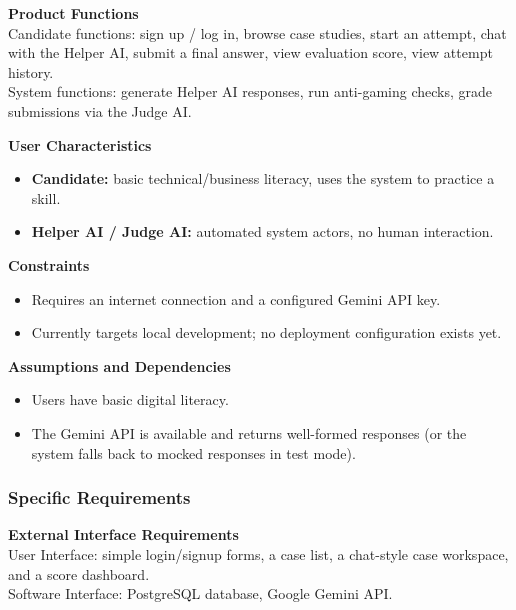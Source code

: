 \documentclass[11pt]{article}
\begin{document}
\textbf{Product Functions}\\
Candidate functions: sign up / log in, browse case studies, start an attempt, chat with the
Helper AI, submit a final answer, view evaluation score, view attempt history.\\
System functions: generate Helper AI responses, run anti-gaming checks, grade submissions
via the Judge AI.

\textbf{User Characteristics}
\begin{itemize}[nosep]
  \item \textbf{Candidate:} basic technical/business literacy, uses the system to practice a skill.
  \item \textbf{Helper AI / Judge AI:} automated system actors, no human interaction.
\end{itemize}

\textbf{Constraints}
\begin{itemize}[nosep]
  \item Requires an internet connection and a configured Gemini API key.
  \item Currently targets local development; no deployment configuration exists yet.
\end{itemize}

\textbf{Assumptions and Dependencies}
\begin{itemize}[nosep]
  \item Users have basic digital literacy.
  \item The Gemini API is available and returns well-formed responses (or the system falls back to mocked responses in test mode).
\end{itemize}

\subsubsection{Specific Requirements}
\textbf{External Interface Requirements}\\
User Interface: simple login/signup forms, a case list, a chat-style case workspace, and a
score dashboard.\\
Software Interface: PostgreSQL database, Google Gemini API.
\end{document}
